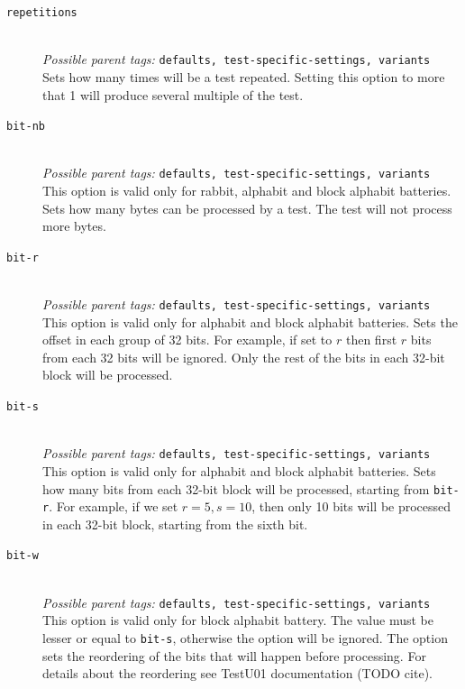 \documentclass[
  digital,  	%
  color,		%
  oneside,   	%
  12pt,
  nocover,
  notable,
  nolof,
  nolot,
]{fithesis3}
\theoremstyle{definition}
\theoremstyle{remark}
\begin{document}
\begin{description}
\item[\texttt{repetitions}] \hfill \\
\textit{Possible parent tags: } \texttt{defaults, test-specific-settings, variants} \\
Sets how many times will be a test repeated. Setting this option to more that 1 will produce several multiple of the test.

\item[\texttt{bit-nb}] \hfill \\
\textit{Possible parent tags: } \texttt{defaults, test-specific-settings, variants} \\
This option is valid only for rabbit, alphabit and block alphabit batteries. Sets how many bytes can be processed by a test. The test will not process more bytes.

\item[\texttt{bit-r}] \hfill \\
\textit{Possible parent tags: } \texttt{defaults, test-specific-settings, variants} \\
This option is valid only for alphabit and block alphabit batteries. Sets the offset in each group of 32 bits. For example, if set to $r$ then first $r$ bits from each 32 bits will be ignored. Only the rest of the bits in each 32-bit block will be processed.

\item[\texttt{bit-s}] \hfill \\
\textit{Possible parent tags: } \texttt{defaults, test-specific-settings, variants} \\
This option is valid only for alphabit and block alphabit batteries. Sets how many bits from each 32-bit block will be processed, starting from \texttt{bit-r}. For example, if we set $r=5, s=10$, then only 10 bits will be processed in each 32-bit block, starting from the sixth bit.

\item[\texttt{bit-w}] \hfill \\
\textit{Possible parent tags: } \texttt{defaults, test-specific-settings, variants} \\
This option is valid only for block alphabit battery. The value must be lesser or equal to \texttt{bit-s}, otherwise the option will be ignored. The option sets the reordering of the bits that will happen before processing. For details about the reordering see TestU01 documentation (TODO cite).


\end{description}
\end{document}
